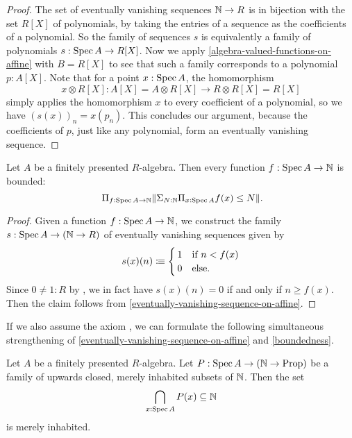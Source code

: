\begin{proof}
  The set of eventually vanishing sequences $\mathbb{N} \to R$
  is in bijection with the set $R[X]$ of polynomials,
  by taking the entries of a sequence as the coefficients of a polynomial.
  So the family of sequences $s$
  is equivalently a family of polynomials $s : \operatorname{Spec} A \to R[X]$.
  Now we apply \cref{algebra-valued-functions-on-affine} with $B = R[X]$
  to see that such a family corresponds to a polynomial $p : A[X]$.
  Note that for a point $x : \operatorname{Spec} A$,
  the homomorphism
  \[ x \otimes R[X] : A[X] = A \otimes R[X] \to R \otimes R[X] = R[X] \]
  simply applies the homomorphism $x$ to every coefficient of a polynomial,
  so we have $(s(x))_n = x(p_n)$.
  This concludes our argument,
  because the coefficients of $p$,
  just like any polynomial,
  form an eventually vanishing sequence.
\end{proof}

\begin{theorem}%
  \label{boundedness}
  Let $A$ be a finitely presented $R$-algebra.
  Then every function $f : \operatorname{Spec} A \to \mathbb{N}$ is bounded:
  \[ \Pi_{f : \Spec A \to \N} \propTrunc{\Sigma_{N : \N} \Pi_{x : \Spec A} f(x) \le N}
     \rlap{.} \]
\end{theorem}

\begin{proof}
  Given a function $f : \operatorname{Spec} A \to \mathbb{N}$,
  we construct the family $s : \operatorname{Spec} A \to (\mathbb{N} \to R)$
  of eventually vanishing sequences
  given by
  \[
    s(x)(n) \colonequiv
    \begin{cases}
      \,1 &\text{if $n < f(x)$}\\
      \,0 &\text{else} \rlap{.}
    \end{cases}
  \]
  Since $0 \neq 1 : R$ by ,
  we in fact have $s(x)(n) = 0$ if and only if $n \geq f(x)$.
  Then the claim follows from \cref{eventually-vanishing-sequence-on-affine}.
\end{proof}

If we also assume the axiom ,
we can formulate the following simultaneous strengthening
of \cref{eventually-vanishing-sequence-on-affine}
and \cref{boundedness}.

\begin{proposition}%
  \label{strengthened-boundedness}
  Let $A$ be a finitely presented $R$-algebra.
  Let $P : \operatorname{Spec} A \to (\mathbb{N} \to \mathrm{Prop})$
  be a family of upwards closed, merely inhabited subsets of $\mathbb{N}$.
  Then the set
  \[ \bigcap_{x : \operatorname{Spec} A} P(x) \subseteq \mathbb{N} \]
  is merely inhabited.
\end{proposition}

